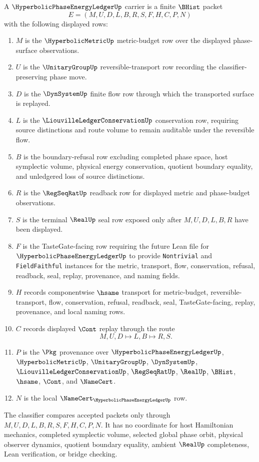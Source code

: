 \begin{definition}
\label{def:hyperbolic-phase-energy-ledger-carrier}
A $\HyperbolicPhaseEnergyLedgerUp$ carrier is a finite $\BHist$ packet
$$
E=(M,U,D,L,B,R,S,F,H,C,P,N)
$$
with the following displayed rows:
\begin{enumerate}
\item $M$ is the $\HyperbolicMetricUp$ metric-budget row over the displayed phase-surface observations.
\item $U$ is the $\UnitaryGroupUp$ reversible-transport row recording the classifier-preserving phase move.
\item $D$ is the $\DynSystemUp$ finite flow row through which the transported surface is replayed.
\item $L$ is the $\LiouvilleLedgerConservationUp$ conservation row, requiring source distinctions and route volume to remain auditable under the reversible flow.
\item $B$ is the boundary-refusal row excluding completed phase space, host symplectic volume, physical energy conservation, quotient boundary equality, and unledgered loss of source distinctions.
\item $R$ is the $\RegSeqRatUp$ readback row for displayed metric and phase-budget observations.
\item $S$ is the terminal $\RealUp$ seal row exposed only after $M,U,D,L,B,R$ have been displayed.
\item $F$ is the TasteGate-facing row requiring the future Lean file for $\HyperbolicPhaseEnergyLedgerUp$ to provide \texttt{Nontrivial} and \texttt{FieldFaithful} instances for the metric, transport, flow, conservation, refusal, readback, seal, replay, provenance, and naming fields.
\item $H$ records componentwise $\hsame$ transport for metric-budget, reversible-transport, flow, conservation, refusal, readback, seal, TasteGate-facing, replay, provenance, and local naming rows.
\item $C$ records displayed $\Cont$ replay through the route
$$
M,U,D \longmapsto L,B \longmapsto R,S .
$$
\item $P$ is the $\Pkg$ provenance over $\HyperbolicPhaseEnergyLedgerUp$, $\HyperbolicMetricUp$, $\UnitaryGroupUp$, $\DynSystemUp$, $\LiouvilleLedgerConservationUp$, $\RegSeqRatUp$, $\RealUp$, $\BHist$, $\hsame$, $\Cont$, and $\NameCert$.
\item $N$ is the local $\NameCert_{\HyperbolicPhaseEnergyLedgerUp}$ row.
\end{enumerate}
The classifier compares accepted packets only through $M,U,D,L,B,R,S,F,H,C,P,N$. It has no coordinate for host Hamiltonian mechanics, completed symplectic volume, selected global phase orbit, physical observer dynamics, quotient boundary equality, ambient $\RealUp$ completeness, Lean verification, or bridge checking.
\end{definition}

